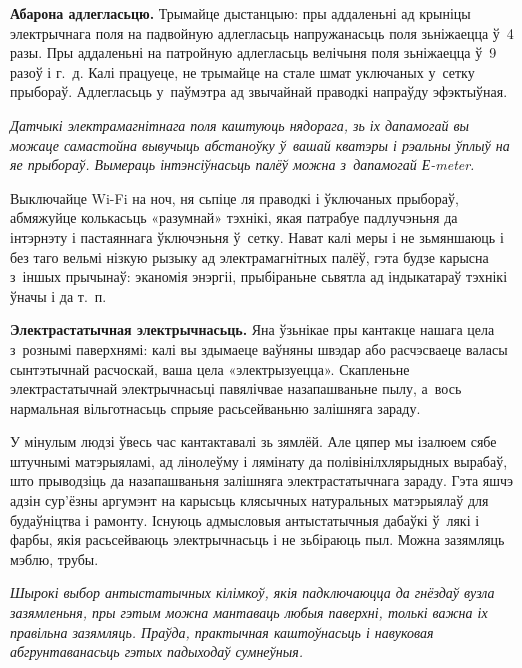 
\textbf{Абарона адлегласьцю.} Трымайце дыстанцыю: пры аддаленьні ад крыніцы электрычнага поля на падвойную адлегласьць напружанасьць поля зьніжаецца ў~4 разы. Пры аддаленьні на патройную адлегласьць велічыня поля зьніжаецца ў~9 разоў і г.~д. Калі працуеце, не трымайце на стале шмат уключаных у~сетку прыбораў. Адлегласьць у~паўмэтра ад звычайнай праводкі напраўду эфэктыўная.

\emph{Датчыкі электрамагнітнага поля каштуюць нядорага, зь іх дапамогай вы можаце самастойна вывучыць абстаноўку ў~вашай кватэры і рэальны ўплыў на яе прыбораў. Вымераць інтэнсіўнасьць палёў можна з~дапамогай Е-meter.}

Выключайце Wi-Fi на ноч, ня сьпіце ля праводкі і ўключаных прыбораў, абмяжуйце колькасьць «разумнай» тэхнікі, якая патрабуе падлучэньня да інтэрнэту і пастаяннага ўключэньня ў~сетку. Нават калі меры і не зьмяншаюць і без таго вельмі нізкую рызыку ад электрамагнітных палёў, гэта будзе карысна з~іншых прычынаў: эканомія энэргіі, прыбіраньне сьвятла ад індыкатараў тэхнікі ўначы і да т.~п.

\textbf{Электрастатычная электрычнасьць.} Яна ўзьнікае пры кантакце нашага цела з~рознымі паверхнямі: калі вы здымаеце ваўняны швэдар або расчэсваеце валасы сынтэтычнай расчоскай, ваша цела «электрызуецца». Скапленьне электрастатычнай электрычнасьці павялічвае назапашваньне пылу, а~вось нармальная вільготнасьць спрыяе расьсейваньню залішняга зараду.


У мінулым людзі ўвесь час кантактавалі зь зямлёй. Але цяпер мы ізалюем сябе штучнымі матэрыяламі, ад лінолеўму і лямінату да полівінілхлярыдных вырабаў, што прыводзіць да назапашваньня залішняга электрастатычнага зараду. Гэта яшчэ адзін сур'ёзны аргумэнт на карысьць клясычных натуральных матэрыялаў для будаўніцтва і рамонту. Існуюць адмысловыя антыстатычныя дабаўкі ў~лякі і фарбы, якія расьсейваюць электрычнасьць і не зьбіраюць пыл. Можна зазямляць мэблю, трубы.

\emph{Шырокі выбор антыстатычных кілімкоў, якія падключаюцца да гнёздаў вузла зазямленьня, пры гэтым можна мантаваць любыя паверхні, толькі важна іх правільна зазямляць. Праўда, практычная каштоўнасьць і навуковая абгрунтаванасьць гэтых падыходаў сумнеўныя.}

